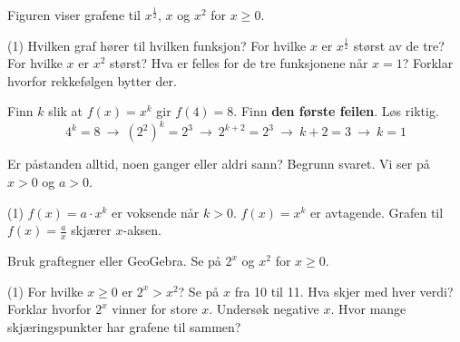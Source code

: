 Figuren viser grafene til $x^{\tfrac12}$, $x$ og $x^2$ for $x \ge 0$.
\begin{center}
\end{center}
\begin{tasks}(1)
  \task Hvilken graf hører til hvilken funksjon?
  \task For hvilke $x$ er $x^{\tfrac12}$ størst av de tre? For hvilke $x$ er $x^2$ størst?
  \task Hva er felles for de tre funksjonene når $x = 1$? Forklar hvorfor rekkefølgen bytter der.
\end{tasks}

Finn $k$ slik at $f(x) = x^k$ gir $f(4) = 8$. Finn \textbf{den første feilen}. Løs riktig.
\[ 4^k = 8 \ \longrightarrow\ (2^2)^k = 2^3 \ \longrightarrow\ 2^{k+2} = 2^3 \ \longrightarrow\ k + 2 = 3 \ \longrightarrow\ k = 1 \]


Er påstanden alltid, noen ganger eller aldri sann? Begrunn svaret.
Vi ser på $x > 0$ og $a > 0$.
\begin{tasks}(1)
  \task $f(x) = a \cdot x^k$ er voksende når $k > 0$.
  \task $f(x) = x^k$ er avtagende.
  \task Grafen til $f(x) = \frac{a}{x}$ skjærer $x$-aksen.
\end{tasks}

Bruk graftegner eller GeoGebra. Se på $2^x$ og $x^2$ for $x \ge 0$.
\begin{tasks}(1)
  \task For hvilke $x \ge 0$ er $2^x > x^2$?
  \task Se på $x$ fra 10 til 11. Hva skjer med hver verdi? Forklar hvorfor $2^x$ vinner for store $x$.
  \task Undersøk negative $x$. Hvor mange skjæringspunkter har grafene til sammen?
\end{tasks}

